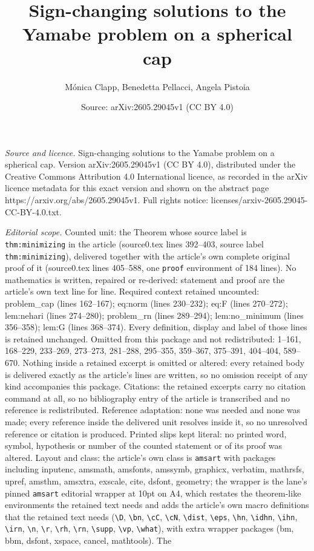 \documentclass[10pt,a4paper]{amsart}
\title[Sign-changing solutions to the Yamabe problem on a spherical]{Sign-changing solutions to the Yamabe problem on a spherical cap}
\author{M\'onica Clapp, Benedetta Pellacci, Angela Pistoia}
\date{Source: arXiv:2605.29045v1 (CC BY 4.0)}
\begin{document}
\maketitle

\noindent\emph{Source and licence.} Sign-changing solutions to the Yamabe problem on a spherical cap. Version arXiv:2605.29045v1 (CC BY 4.0), distributed under the Creative Commons Attribution 4.0 International licence, as recorded in the arXiv licence metadata for this exact version and shown on the abstract page https://arxiv.org/abs/2605.29045v1. Full rights notice: licenses/arxiv-2605.29045-CC-BY-4.0.txt.\par\smallskip

\noindent\textit{Editorial scope.} Counted unit: the Theorem whose source label is \texttt{thm:minimizing} in the article (source0.tex lines 392--403, source label \texttt{thm:minimizing}), delivered together with the article's own complete original proof of it (source0.tex lines 405--588, one \texttt{proof} environment of 184 lines). No mathematics is written, repaired or re-derived: statement and proof are the article's own text line for line. Required context retained uncounted: problem\_cap (lines 162--167); eq:norm (lines 230--232); eq:F (lines 270--272); lem:nehari (lines 274--280); problem\_rn (lines 289--294); lem:no\_minimum (lines 356--358); lem:G (lines 368--374). Every definition, display and label of those lines is retained unchanged. Omitted from this package and not redistributed: 1--161, 168--229, 233--269, 273--273, 281--288, 295--355, 359--367, 375--391, 404--404, 589--670. Nothing inside a retained excerpt is omitted or altered: every retained body is delivered exactly as the article's lines are written, so no omission receipt of any kind accompanies this package. Citations: the retained excerpts carry no citation command at all, so no bibliography entry of the article is transcribed and no reference is redistributed. Reference adaptation: none was needed and none was made; every reference inside the delivered unit resolves inside it, so no unresolved reference or citation is produced. Printed slips kept literal: no printed word, symbol, hypothesis or number of the counted statement or of its proof was altered. Layout and class: the article's own class is \texttt{amsart} with packages including inputenc, amsmath, amsfonts, amssymb, graphicx, verbatim, mathrsfs, upref, amsthm, amsxtra, exscale, cite, dsfont, geometry; the wrapper is the lane's pinned \texttt{amsart} editorial wrapper at 10pt on A4, which restates the theorem-like environments the retained text needs and adds the article's own macro definitions that the retained text needs (\texttt{\textbackslash D}, \texttt{\textbackslash bn}, \texttt{\textbackslash cC}, \texttt{\textbackslash cN}, \texttt{\textbackslash dist}, \texttt{\textbackslash eps}, \texttt{\textbackslash hn}, \texttt{\textbackslash idhn}, \texttt{\textbackslash ihn}, \texttt{\textbackslash irn}, \texttt{\textbackslash n}, \texttt{\textbackslash r}, \texttt{\textbackslash rh}, \texttt{\textbackslash rn}, \texttt{\textbackslash supp}, \texttt{\textbackslash vp}, \texttt{\textbackslash what}), with extra wrapper packages (bm, bbm, dsfont, xspace, cancel, mathtools). The 
\end{document}
